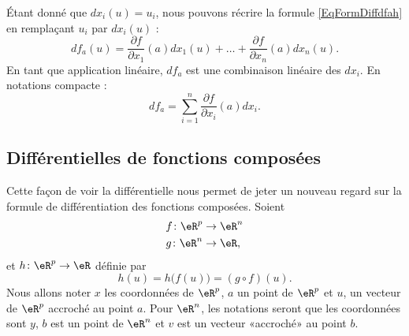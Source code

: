 Étant donné que $dx_i(u)=u_i$, nous pouvons récrire la formule \eqref{EqFormDiffdfah} en remplaçant $u_i$ par $dx_i(u)$ :
\begin{equation}
    df_a(u)=\frac{ \partial f }{ \partial x_1 }(a)dx_1(u)+\ldots+\frac{ \partial f }{ \partial x_n }(a)dx_n(u).
\end{equation}
En tant que application linéaire, $df_a$ est une combinaison linéaire des $dx_i$. En notations compacte :
\begin{equation}
    df_a=\sum_{i=1}^n\frac{ \partial f }{ \partial x_i }(a)dx_i.
\end{equation}

\subsection{Différentielles de fonctions composées}

Cette façon de voir la différentielle nous permet de jeter un nouveau regard sur la formule de différentiation des fonctions composées. Soient
\begin{equation}
    \begin{aligned}[]
        f\colon \eR^p&\to \eR^n\\
        g\colon \eR^n&\to \eR,
    \end{aligned}
\end{equation}
et $h\colon \eR^p\to \eR$ définie par 
\begin{equation}
    h(u)=h\big( f(u) \big)=(g\circ f)(u).
\end{equation}
Nous allons noter $x$ les coordonnées de $\eR^p$, $a$ un point de $\eR^p$ et $u$, un vecteur de $\eR^p$ accroché au point $a$. Pour $\eR^n$, les notations seront que les coordonnées sont $y$, $b$ est un point de $\eR^n$ et $v$ est un vecteur «accroché» au point $b$.

